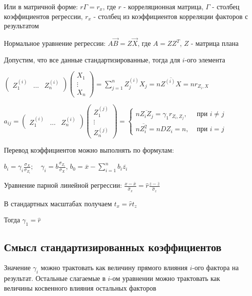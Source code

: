 \documentclass[12pt]{article}
\begin{document}
\smallvspace

Или в матричной форме: $r \Gamma = r_x$, где $r$ - корреляционная матрица, $\Gamma$ - столбец коэффициентов регрессии, $r_x$ - столбец из коэффициентов корреляции факторов с результатом

Нормальное уравнение регрессии: $A \vec B = Z \vec X$, где $A = Z Z^T$, $Z$ - матрица плана

Допустим, что все данные стандартизированные, тогда для $i$-ого элемента

$\begin{pmatrix}Z_1^{(i)} & \dots & Z_n^{(i)}\end{pmatrix} \begin{pmatrix}X_1 \\ \vdots \\ X_n\end{pmatrix} = 
\sum_{j = 1}^n Z^{(i)}_j X_j = n \overline{Z^{(i)} X} = n r_{Z_i, X}$

$a_{ij} = \begin{pmatrix}Z_1^{(i)} & \dots & Z_n^{(i)}\end{pmatrix} \begin{pmatrix}Z_1^{(j)} \\ \vdots \\ Z_n^{(j)}\end{pmatrix} = 
\begin{cases}
    n \overline{Z_i Z_j} = \gamma_1 r_{Z_i, Z_j}, & \text{ при } i \neq j \\
    n \overline{Z_i^2} = n D Z_i = n, & \text{ при } i = j
\end{cases}$

Перевод коэффициентов можно выполнять по формулам:

$b_i = \gamma_i \frac{\sigma_X}{\sigma_{Z_i}}; \quad \gamma_i = b \frac{\sigma_{Z_i}}{\sigma_X}$, $b_0 = \overline{x} - \sum_{i = 1}^n b_i \overline{z_i}$

\Ex Уравнение парной линейной регрессии:
$\frac{x - \overline{x}}{\hat \sigma_x} = \hat r \frac{z - \overline{z}}{\hat \sigma_z}$

В стандартных масштабах получаем $t_x = \hat r t_z$

Тогда $\gamma_1 = \hat r$

\subsection{Смысл стандартизированных коэффициентов}

Значение $\gamma_i$ можно трактовать как величину прямого влияния $i$-ого фактора на результат. Остальные слагаемые в $i$-ом уравнении можно трактовать
как величины косвенного влияния остальных факторов 
\end{document}
